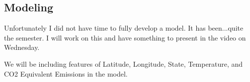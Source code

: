 \subsection{Modeling}
Unfortunately I did not have time to fully develop a model. It has been...quite the semester. I will work on this and have something to present in the video on Wednesday. 

We will be including features of Latitude, Longitude, State, Temperature, and CO2 Equivalent Emissions in the model. 